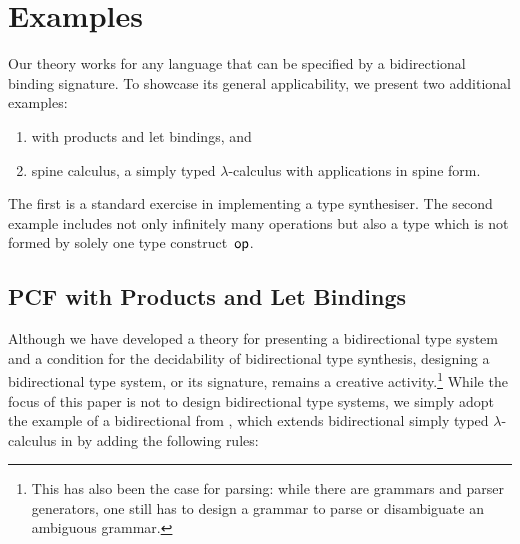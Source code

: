 
\section{Examples}\label{sec:example}
Our theory works for any language that can be specified by a bidirectional binding signature.
To showcase its general applicability, we present two additional examples:
\begin{enumerate}
\item \PCF with products and let bindings, and
\item spine calculus, a simply typed $\lambda$-calculus with applications in spine form.
\end{enumerate}
The first is a standard exercise in implementing a type synthesiser.
The second example includes not only infinitely many operations but also a type which is not formed by solely one type construct~$\mathsf{op}$.

\subsection{PCF with Products and Let Bindings}\label{subsec:PCF}
Although we have developed a theory for presenting a bidirectional type system and a condition for the decidability of bidirectional type synthesis, designing a bidirectional type system, or its signature, remains a creative activity.\footnote{This has also been the case for parsing: while there are grammars and parser generators, one still has to design a grammar to parse or disambiguate an ambiguous grammar.}
While the focus of this paper is not to design bidirectional type systems, we simply adopt the example of a bidirectional \PCF from \citet{Wadler2022}, which extends bidirectional simply typed $\lambda$-calculus in  by adding the following rules:
\bgroup
\small
\egroup

